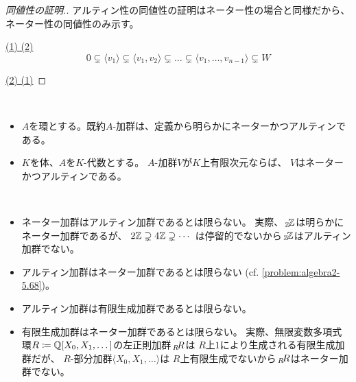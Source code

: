 \documentclass[report]{jlreq}
\begin{document}
\begin{proof}[同値性の証明.]
    アルティン性の同値性の証明はネーター性の場合と同様だから、
    ネーター性の同値性のみ示す。

    \uline{(1) \Rightarrow (2)} \quad
    \begin{equation}
        0
            \subsetneq \langle v_1 \rangle
            \subsetneq \langle v_1, v_2 \rangle
            \subsetneq \dots
            \subsetneq \langle v_1, \dots, v_{n - 1} \rangle
            \subsetneq W
    \end{equation}
    \TODO{}

    \uline{(2) \Rightarrow (1)} \quad
    \TODO{}
\end{proof}

\begin{example}[ネーター環とアルティン環の例]
    ~
    \begin{itemize}
        \item $A$を環とする。既約$A$-加群は、定義から明らかにネーターかつアルティンである。
        \item $K$を体、$A$を$K$-代数とする。
            $A$-加群$V$が$K$上有限次元ならば、
            $V$はネーターかつアルティンである。
    \end{itemize}
\end{example}

\begin{example}
    ~
    \begin{itemize}
        \item ネーター加群はアルティン加群であるとは限らない。
            実際、$\,{}_{\mathbb{Z}}\!\mathbb{Z}$は明らかにネーター加群であるが、
            $2\mathbb{Z} \supsetneq 4\mathbb{Z} \supsetneq \cdots$
            は停留的でないから$\,{}_{\mathbb{Z}}\!\mathbb{Z}$はアルティン加群でない。
        \item アルティン加群はネーター加群であるとは限らない
            (cf. \cref{problem:algebra2-5.68})。
        \item アルティン加群は有限生成加群であるとは限らない。
        \item 有限生成加群はネーター加群であるとは限らない。
            実際、無限変数多項式環$R \coloneqq \mathbb{Q}[X_0, X_1, \dots]$の左正則加群$\,{}_{R}\!R$は
            $R$上$1$により生成される有限生成加群だが、
            $R$-部分加群$\langle X_0, X_1, \dots \rangle$は
            $R$上有限生成でないから$\,{}_{R}\!R$はネーター加群でない。
    \end{itemize}
\end{example}
\end{document}
